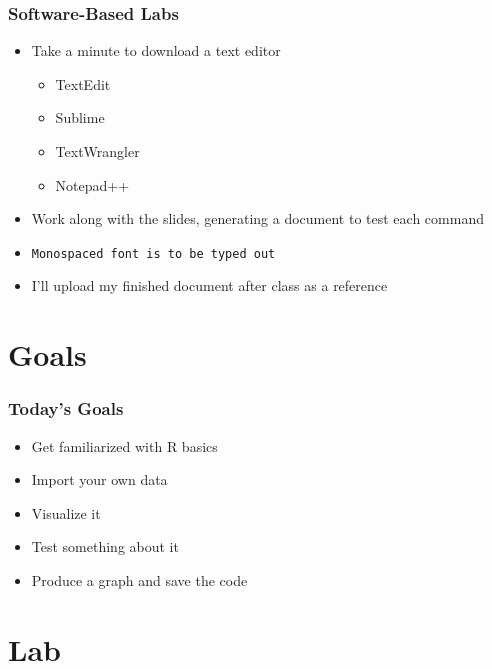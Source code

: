 \documentclass[14pt]{beamer}
\begin{document}
\begin{frame}
\frametitle{Software-Based Labs}
\begin{itemize}
	\item<+-> Take a minute to download a text editor
	\begin{itemize}
		\item TextEdit
		\item Sublime
		\item TextWrangler
		\item Notepad++
	\end{itemize}
	\item<+-> Work along with the slides, generating a document to test each command
	\item<+-> \texttt{Monospaced font is to be typed out}
	\item<+-> I'll upload my finished document after class as a reference
\end{itemize}
\end{frame}

\section{Goals} %

\begin{frame}
\frametitle{Today's Goals}
\begin{itemize}
	\item Get familiarized with R basics
	\item Import your own data
	\item Visualize it
	\item Test something about it
	\item Produce a graph and save the code
\end{itemize}
\end{frame}

\section{Lab}

\end{document}
